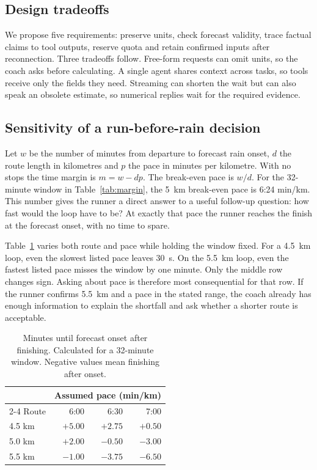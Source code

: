 \documentclass[conference]{IEEEtran}
\begin{document}
\subsection{Design tradeoffs}
We propose five requirements: preserve units, check forecast validity, trace factual claims to tool outputs, reserve quota and retain confirmed inputs after reconnection. Three tradeoffs follow. Free-form requests can omit units, so the coach asks before calculating. A single agent shares context across tasks, so tools receive only the fields they need. Streaming can shorten the wait but can also speak an obsolete estimate, so numerical replies wait for the required evidence.

\subsection{Sensitivity of a run-before-rain decision}
Let $w$ be the number of minutes from departure to forecast rain onset, $d$ the route length in kilometres and $p$ the pace in minutes per kilometre. With no stops the time margin is $m=w-dp$. The break-even pace is $w/d$. For the 32-minute window in Table~\ref{tab:margin}, the 5~km break-even pace is 6:24 min/km. This number gives the runner a direct answer to a useful follow-up question: how fast would the loop have to be? At exactly that pace the runner reaches the finish at the forecast onset, with no time to spare.

Table~\ref{tab:grid} varies both route and pace while holding the window fixed. For a 4.5~km loop, even the slowest listed pace leaves 30~s. On the 5.5~km loop, even the fastest listed pace misses the window by one minute. Only the middle row changes sign. Asking about pace is therefore most consequential for that row. If the runner confirms 5.5~km and a pace in the stated range, the coach already has enough information to explain the shortfall and ask whether a shorter route is acceptable.

\begin{table}[tb]
\caption{Minutes until forecast onset after finishing. Calculated for a 32-minute window. Negative values mean finishing after onset.}
\label{tab:grid}\centering\small
\begin{tabular}{@{}lrrr@{}}\toprule
 & \multicolumn{3}{c}{Assumed pace (min/km)}\\
\cmidrule(l){2-4}
Route & 6:00 & 6:30 & 7:00\\\midrule
4.5 km & $+5.00$ & $+2.75$ & $+0.50$\\
5.0 km & $+2.00$ & $-0.50$ & $-3.00$\\
5.5 km & $-1.00$ & $-3.75$ & $-6.50$\\\bottomrule
\end{tabular}
\end{table}
\end{document}
